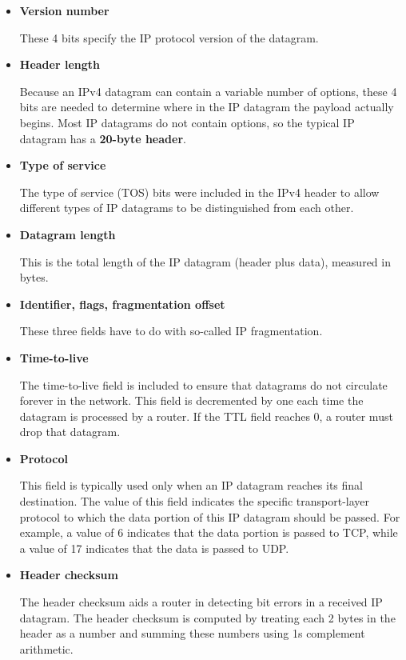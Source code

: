 \documentclass[11pt]{article}
\begin{document}
\begin{itemize}
	
	\item \textbf{Version number}
	
	 These 4 bits specify the IP protocol version of the datagram.
	 
	 \item \textbf{Header length}
	 
	  Because an IPv4 datagram can contain a variable number of options, these 4 bits are needed to determine where in the IP datagram the payload actually begins. Most IP datagrams do not contain options, so the typical IP datagram has a \textbf{20-byte header}.
	  
	  \item \textbf{Type of service}
	  
	  The type of service (TOS) bits were included in the IPv4 header to allow different types of IP datagrams to be distinguished from each other.
	  
	  \item \textbf{Datagram length}
	  
	  This is the total length of the IP datagram (header plus data), measured in bytes.
	  
	  \item \textbf{Identifier, flags, fragmentation offset}
	  
	  These three fields have to do with so-called IP fragmentation.
	  
	  \item \textbf{Time-to-live}
	  
	  The time-to-live field is included to ensure that datagrams do not circulate forever in the network. This field is decremented by one each time the datagram is processed by a router. If the TTL field reaches 0, a router must drop that datagram.
	  
	  \item \textbf{Protocol}
	  
	  This field is typically used only when an IP datagram reaches its final destination. The value of this field indicates the specific transport-layer protocol to which the data portion of this IP datagram should be passed. For example, a value of 6 indicates that the data portion is passed to TCP, while a value of 17 indicates that the data is passed to UDP.
	   
	  \item \textbf{Header checksum}
	  
	  The header checksum aids a router in detecting bit errors in a received IP datagram. The header checksum is computed by treating each 2 bytes in the header as a number and summing these numbers using 1s complement arithmetic. 
	    

\end{itemize}
\end{document}
